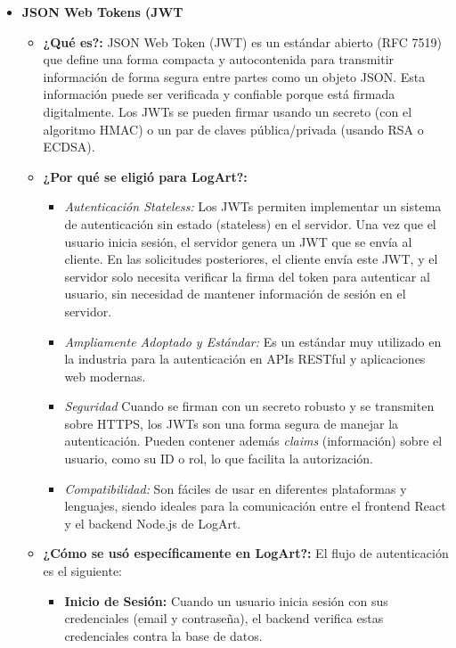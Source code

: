 \begin{itemize}
    \item \textbf{JSON Web Tokens (JWT}
        \begin{itemize}
            \item \textbf{¿Qué es?:} JSON Web Token (JWT) es un estándar abierto (RFC 7519)\cite{rfc7519} que define una forma compacta y autocontenida para transmitir información de forma segura entre partes como un objeto JSON. Esta información puede ser verificada y confiable porque está firmada digitalmente. Los JWTs se pueden firmar usando un secreto (con el algoritmo HMAC) o un par de claves pública/privada (usando RSA o ECDSA). \cite{caronteJWT}
            \item \textbf{¿Por qué se eligió para LogArt?:}
                \begin{itemize}
                    \item \textit{Autenticación Stateless:} Los JWTs permiten implementar un sistema de autenticación sin estado (stateless) en el servidor. Una vez que el usuario inicia sesión, el servidor genera un JWT que se envía al cliente. En las solicitudes posteriores, el cliente envía este JWT, y el servidor solo necesita verificar la firma del token para autenticar al usuario, sin necesidad de mantener información de sesión en el servidor.
                    \item \textit{Ampliamente Adoptado y Estándar:} Es un estándar muy utilizado en la industria para la autenticación en APIs RESTful y aplicaciones web modernas.
                    \item \textit{Seguridad} Cuando se firman con un secreto robusto y se transmiten sobre HTTPS, los JWTs son una forma segura de manejar la autenticación. Pueden contener además \textit{claims} (información) sobre el usuario, como su ID o rol, lo que facilita la autorización.
                    \item \textit{Compatibilidad:} Son fáciles de usar en diferentes plataformas y lenguajes, siendo ideales para la comunicación entre el frontend React y el backend Node.js de LogArt.
                \end{itemize}
            \item \textbf{¿Cómo se usó específicamente en LogArt?:} El flujo de autenticación es el siguiente:
            \begin{itemize}
                \item \textbf{Inicio de Sesión:} Cuando un usuario inicia sesión con sus credenciales (email y contraseña), el backend verifica estas credenciales contra la base de datos.

\end{itemize}
\end{itemize}
\end{itemize}
